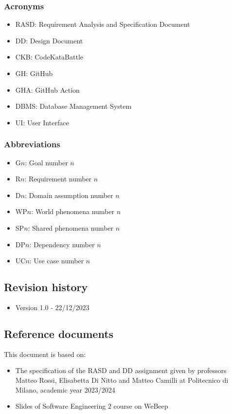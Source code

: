 \subsubsection{Acronyms}
\begin{itemize}
    \item RASD: Requirement Analysis and Specification Document
    \item DD: Design Document
    \item CKB: CodeKataBattle
    \item GH: GitHub
    \item GHA: GitHub Action
    \item DBMS: Database Management System
    \item UI: User Interface
\end{itemize}

\subsubsection{Abbreviations}
\begin{itemize}
    \item G$n$: Goal number $n$
    \item R$n$: Requirement number $n$
    \item D$n$: Domain assumption number $n$
    \item WP$n$: World phenomena number $n$
    \item SP$n$: Shared phenomena number $n$
    \item DP$n$: Dependency number $n$
    \item UC$n$: Use case number $n$
\end{itemize}

\subsection{Revision history}
\begin{itemize}
    \item Version 1.0 - 22/12/2023
\end{itemize}

\subsection{Reference documents}
This document is based on:
\begin{itemize}
    \item The specification of the RASD and DD assignment given by professors Matteo Rossi, Elisabetta Di Nitto and Matteo Camilli at Politecnico di Milano, academic year 2023/2024
    \item Slides of Software Engineering 2 course on WeBeep
\end{itemize}

